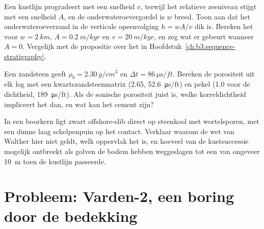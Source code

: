 \begin{exercise}[$\star\star\star$]\label{exo:b3:facies-models:10}
Een kustlijn progradeert met een snelheid $v$, terwijl het relatieve zeeniveau stijgt met
een snelheid $A$, en de onderwateroevergordel is $w$ breed. Toon aan dat het
onderwateroeverzand in de verticale opeenvolging $h = wA/v$ dik is. Bereken het voor
$w = \qty{2}{km}$, $A = \qty{0.2}{m/kyr}$ en $v = \qty{20}{m/kyr}$, en zeg wat er gebeurt
wanneer $A = 0$. Vergelijk met de propositie over het  in
Hoofdstuk~\ref{ch:b3:sequence-stratigraphy}.
\end{exercise}

\begin{exercise}[$\star\star\star$]\label{exo:b3:facies-models:11}
Een zandsteen geeft $\rho_b = \qty{2.30}{g/cm^3}$ en $\Delta t =
\qty{86}{\micro\second/ft}$. Bereken de porositeit uit elk log met een
kwartszandsteenmatrix (2.65, \qty{52.6}{\micro\second/ft}) en pekel (1.0 voor de
dichtheid, \qty{189}{\micro\second/ft}). Als de sonische porositeit juist is, welke
korreldichtheid impliceert het  dan, en wat kan het cement zijn?
\end{exercise}

\begin{exercise}[$\star\star\star$]\label{exo:b3:facies-models:12}
In een boorkern ligt zwart offshore-slib direct op steenkool met wortelsporen, met een
dunne laag schelpenpuin op het contact. Verklaar waarom de wet van Walther hier niet
geldt, welk oppervlak het is, en hoeveel van de kustsuccessie mogelijk ontbreekt als
golven de bodem hebben weggeslagen tot een  van ongeveer
\qty{10}{m} toen de kustlijn passeerde.
\end{exercise}

\section{Probleem: Varden-2, een boring door de bedekking}


